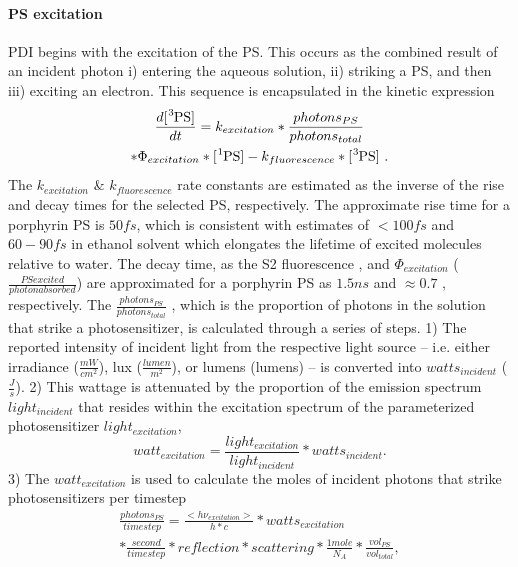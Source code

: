 \paragraph{PS excitation}
PDI begins with the excitation of the PS. This occurs as the combined result of an incident photon i) entering the aqueous solution, ii) striking a PS, and then iii) exciting an electron. This sequence is encapsulated in the kinetic expression
\begin{multline} \label{ps_excitation_kinetics}
    \frac{d[\ce{^3PS}]}{dt} =  k_{excitation}*\frac{photons_{PS}}{photons_{total}} \\ 
    *\Phi_{excitation}*[\ce{^1PS}] - k_{fluorescence}*[\ce{^3PS}]~. 
\end{multline}
The $k_{excitation}$ \& $k_{fluorescence}$ rate constants are estimated as the inverse of the rise and decay times for the selected PS, respectively. The approximate rise time for a porphyrin PS is $50 fs$, which is consistent with estimates of $<100 fs$ \cite{Andersson1999PhotoinducedState} and $60-90 fs$ in ethanol solvent \cite{Gurzadyan1998Time-resolvedZn-tetraphenylporphyrin} which elongates the lifetime of excited molecules relative to water. The decay time, as the S2 fluorescence \cite{Akimoto1999UltrafastPorphyrins}, and $\Phi_{excitation}$ ($\frac{PS excited}{photon absorbed}$) are approximated for a porphyrin PS as $1.5 ns$ and $\approx 0.7$ \cite{Krasnovsky2012PhotochemicalEnvironment}, respectively. The $\frac{photons_{PS}}{photons_{total}}$ \cite{Brasel2020AnAgalactiae}, which is the proportion of photons in the solution that strike a photosensitizer, is calculated through a series of steps. 1) The reported intensity of incident light from the respective light source -- i.e. either irradiance ($\frac{mW}{cm^2}$), lux ($\frac{lumen}{m^2}$), or lumens (lumens) -- is converted into $watts_{incident}$ ($\frac{J}{s}$). 2) This wattage is attenuated by the proportion of the emission spectrum $light_{incident}$ that resides within the excitation spectrum of the parameterized photosensitizer $light_{excitation}$, 
\begin{equation}
    watt_{excitation} = \frac{light_{excitation}}{light_{incident}}*watts_{incident}.
\end{equation}
3) The $watt_{excitation}$ is used to calculate the moles of incident photons that strike photosensitizers per timestep 
\begin{multline} \label{photons_per_second}
    \frac{photons_{PS}}{timestep}=\frac{<h\nu_{excitation}>}{h*c}*watts_{excitation} \\
    *\frac{second}{timestep}*reflection*scattering*\frac{1 mole}{N_A}*\frac{vol_{PS}}{vol_{total}},
\end{multline}
